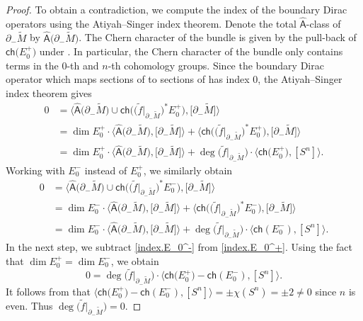\documentclass[pdftex]{sigma}
\numberwithin{equation}{section}
\begin{document}
\begin{proof}
To obtain a contradiction, we compute the index of the boundary Dirac operators using the Atiyah--Singer index theorem.
Denote the total $\hat{\mathsf{A}}$-class of $\partial_- \tilde{M}$ by $\hat{\mathsf{A}}\big(\partial_- \tilde{M}\big)$. The Chern character of the bundle  is given by the pull-back of $\mathsf{ch}\big(E_0^+\big)$ under . In particular, the Chern character of the bundle  only contains terms in the $0$-th and $n$-th cohomology groups. Since the boundary Dirac operator which maps sections of  to sections of  has index $0$, the Atiyah--Singer index theorem gives
\begin{align}
0
&= \big\langle \hat{\mathsf{A}}\big(\partial_- \tilde{M}\big) \cup \mathsf{ch}\big(\big( \tilde{f}|_{\partial_- \tilde{M}}\big)^* E_0^+\big),\big[\partial_- \tilde{M}\big] \big\rangle\nonumber \\
&= \dim E_0^+ \cdot \big\langle \hat{\mathsf{A}}\big(\partial_- \tilde{M}\big),\big[\partial_- \tilde{M}\big] \big\rangle + \big\langle \mathsf{ch}\big(\big( \tilde{f}|_{\partial_- \tilde{M}}\big)^* E_0^+\big), \big[\partial_- \tilde{M}\big] \big\rangle\nonumber \\
&= \dim E_0^+ \cdot \big\langle \hat{\mathsf{A}}\big(\partial_- \tilde{M}\big),\big[\partial_- \tilde{M}\big] \big\rangle + \deg\big(\tilde{f}|_{\partial_- \tilde{M}}\big) \cdot \big\langle \mathsf{ch}\big(E_0^+\big), [S^n] \big\rangle. \label{index.E_0^+}
\end{align}
Working with $E_0^-$ instead of $E_0^+$, we similarly obtain
\begin{align}
0
&= \big\langle \hat{\mathsf{A}}\big(\partial_- \tilde{M}\big) \cup \mathsf{ch}\big(\big( \tilde{f}|_{\partial_- \tilde{M}}\big)^* E_0^-\big),\big[\partial_- \tilde{M}\big] \big\rangle\nonumber \\
&= \dim E_0^- \cdot \big\langle \hat{\mathsf{A}}\big(\partial_- \tilde{M}\big),\big[\partial_- \tilde{M}\big] \big\rangle + \big\langle \mathsf{ch}\big(\big( \tilde{f}|_{\partial_- \tilde{M}}\big)^* E_0^-\big), \big[\partial_- \tilde{M}\big] \big\rangle \nonumber\\
&= \dim E_0^- \cdot \big\langle \hat{\mathsf{A}}\big(\partial_- \tilde{M}\big),\big[\partial_- \tilde{M}\big] \big\rangle + \deg\big(\tilde{f}|_{\partial_- \tilde{M}}\big) \cdot \big\langle \mathsf{ch}(E_0^-), [S^n] \big\rangle.\label{index.E_0^-}
\end{align}
In the next step, we subtract \eqref{index.E_0^-} from \eqref{index.E_0^+}.
Using the fact that $\dim E_0^+ = \dim E_0^-$, we obtain
\[
 0 = \deg\big(\tilde{f}|_{\partial_- \tilde{M}}\big) \cdot \big\langle \mathsf{ch}\big(E_0^+\big) - \mathsf{ch}(E_0^-), [S^n] \big\rangle.
 \]
It follows from \cite[Proposition~11.24, Chapter~III]{Lawson-Michelsohn} that $\big\langle \mathsf{ch}\big(E_0^+\big) - \mathsf{ch}(E_0^-), [S^n] \big\rangle = \pm \chi(S^n) =\pm 2 \neq 0$ since $n$ is even.
Thus $\deg\big(\tilde{f}|_{\partial_- \tilde{M}}\big)=0$.


\end{proof}
\end{document}
